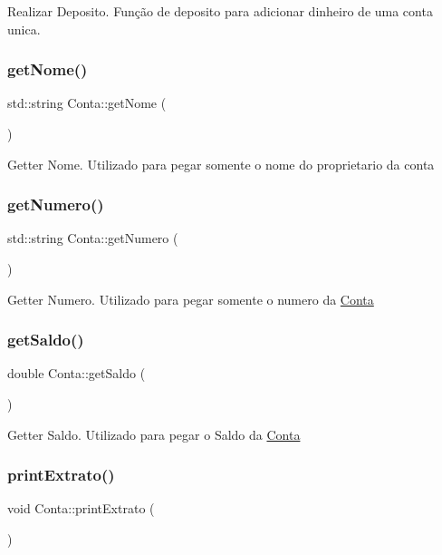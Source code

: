 Realizar Deposito. Função de deposito para adicionar dinheiro de uma conta unica. \mbox{\label{classConta_afb0c4a2741f4636648d962c78bc54a9a}} 
\subsubsection{\texorpdfstring{get\+Nome()}{getNome()}}
{\footnotesize\ttfamily std\+::string Conta\+::get\+Nome (\begin{DoxyParamCaption}{ }\end{DoxyParamCaption})}

Getter Nome. Utilizado para pegar somente o nome do proprietario da conta \mbox{\label{classConta_a955a7f08e45fce65f4d1ded10836a7b2}} 
\subsubsection{\texorpdfstring{get\+Numero()}{getNumero()}}
{\footnotesize\ttfamily std\+::string Conta\+::get\+Numero (\begin{DoxyParamCaption}{ }\end{DoxyParamCaption})}

Getter Numero. Utilizado para pegar somente o numero da \hyperlink{classConta}{Conta} \mbox{\label{classConta_a6db61cbaef5a054ef632597316a6aaf2}} 
\subsubsection{\texorpdfstring{get\+Saldo()}{getSaldo()}}
{\footnotesize\ttfamily double Conta\+::get\+Saldo (\begin{DoxyParamCaption}{ }\end{DoxyParamCaption})}

Getter Saldo. Utilizado para pegar o Saldo da \hyperlink{classConta}{Conta} \mbox{\label{classConta_a39bd0d37b4c2e613542c3d7e794d5059}} 
\subsubsection{\texorpdfstring{print\+Extrato()}{printExtrato()}}
{\footnotesize\ttfamily void Conta\+::print\+Extrato (\begin{DoxyParamCaption}{ }\end{DoxyParamCaption})}

